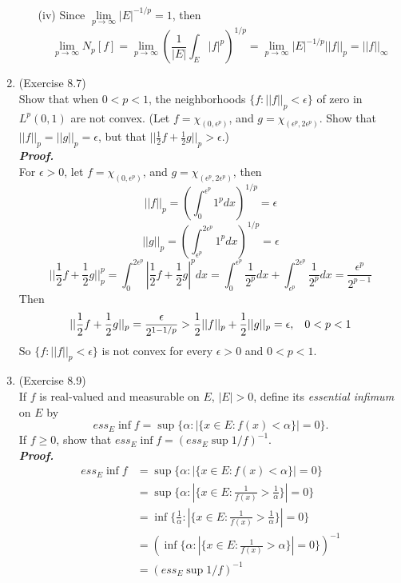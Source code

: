 \documentclass[a4paper,11pt]{article}
\begin{document}
\begin{enumerate}
\begin{enumerate}
	 	\item[(iv)]
	 		Since $\underset{p \to \infty}{\lim} |E|^{-1/p} = 1$, then
	 			$$\lim_{p \to \infty} N_p[f]
	 			= \lim_{p \to \infty} \left( \frac{1}{|E|} \int_E |f|^p \right)^{1/p}
	 			= \lim_{p \to \infty} |E|^{-1/p} ||f||_p
	 			= ||f||_\infty$$

 	\end{enumerate}


	\item (Exercise 8.7)\\
		Show that when $0 < p < 1$, the neighborhoods $\{f : ||f||_p < \epsilon \}$ of zero in $L^p(0,1)$ are not convex. (Let $f = \chi_{(0,\epsilon^p)}$, and $g = \chi_{(\epsilon^p, 2\epsilon^p)}$. Show that $||f||_p = ||g||_p = \epsilon$, but that $||\frac{1}{2}f + \frac{1}{2}g ||_p > \epsilon$.)\\
	\newline
 	\textit{\textbf {Proof.}}\\
 		For $\epsilon > 0$, let $f = \chi_{(0,\epsilon^p)}$, and $g = \chi_{(\epsilon^p, 2\epsilon^p)}$, then
 			$$||f||_p = \left( \int_0^{\epsilon^p} 1^p dx \right)^{1/p} = \epsilon$$
 			$$||g||_p = \left( \int_{\epsilon^p}^{2\epsilon^p} 1^p dx \right)^{1/p} = \epsilon$$
 			$$||\frac{1}{2}f + \frac{1}{2}g||_p^p
 			= \int_0^{2 \epsilon^p} |\frac{1}{2}f + \frac{1}{2}g|^p dx
 			= \int_0^{\epsilon^p} \frac{1}{2^p} dx + \int_{\epsilon^p}^{2\epsilon^p} \frac{1}{2^p} dx
 			= \frac{\epsilon^p}{2^{p-1}}$$
 		Then
 			$$||\frac{1}{2}f + \frac{1}{2}g||_p = \frac{\epsilon}{2^{1-1/p}} > \frac{1}{2}||f||_p + \frac{1}{2}||g||_p = \epsilon, \hspace{0.3cm} 0 < p < 1$$
 		So $\{f : ||f||_p < \epsilon \}$ is not convex for every $\epsilon > 0$ and $0 < p < 1$.\\


	\item (Exercise 8.9)\\
		If $f$ is real-valued and measurable on $E$, $|E| > 0$, define its \textit{essential infimum} on $E$ by
			$$ess_E \inf f = \sup \{ \alpha : | \{ x \in E : f(x) < \alpha \} | = 0 \}.$$
		If $f \geq 0$, show that $ess_E \inf f = (ess_E \sup 1/f)^{-1}$.\\
	\newline
 	\textit{\textbf {Proof.}}\\
 		$$\begin{aligned}
 		ess_E \inf f
 		&= \sup \{ \alpha : | \{ x \in E : f(x) < \alpha \} | = 0 \}\\
 		&= \sup \{ \alpha : | \{ x \in E : \frac{1}{f(x)} > \frac{1}{\alpha} \} | = 0 \}\\
 		&= \inf \{ \frac{1}{\alpha} : | \{ x \in E : \frac{1}{f(x)} > \frac{1}{\alpha} \} | = 0 \}\\
 		&= \left( \inf \{ \alpha : | \{ x \in E : \frac{1}{f(x)} > \alpha \} | = 0 \} \right)^{-1}\\
 		&= (ess_E \sup 1/f)^{-1}
 		\end{aligned}$$\



\end{enumerate}
\end{document}
